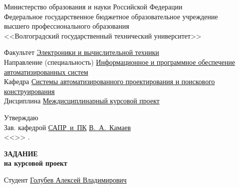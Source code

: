\begin{titlepage}
    \begin{center}
        Министерство образования и науки Российской Федерации \\
        Федеральное государственное бюджетное образовательное учреждение\\
        высшего профессионального образования\\
        <<Волгоградский государственный технический университет>>\\
    \end{center}
    Факультет \underline{\hspace{1cm}Электроники и вычислительной техники\hspace{4.75cm}}\\
    Направление (специальность) \underline{Информационное и программное обеспечение\hspace{0.2cm}}\\
    \underline{автоматизированных систем\hspace{10.8cm}}\\
    Кафедра \underline{\hspace{1.4cm}Системы автоматизированного проектирования и поискового\hspace{0.3cm}}\\
    \underline{конструирования\hspace{13.3cm}}\\
    Дисциплина \underline{\hspace{1cm}Междисциплинарный курсовой проект}
    \begin{flushright}
        Утверждаю\\
        Зав. кафедрой \underline{САПР~и~ПК} \hspace{0.2cm} \underline{В.~А.~Камаев} \\
        <<\underline{\hspace{2cm}}>>\underline{\hspace{5cm}} \the{}.
    \end{flushright}
    \begin{center}
        \large \MakeUppercase{\textbf{задание}} \\
        \normalsize\vspace{-0.2cm}\textbf{на курсовой проект}
    \end{center}
    \begin{flushleft}
        Студент \underline{\hspace{1cm}Голубев Алексей Владимирович\hspace{2cm}}\\

\end{flushleft}
\end{titlepage}
